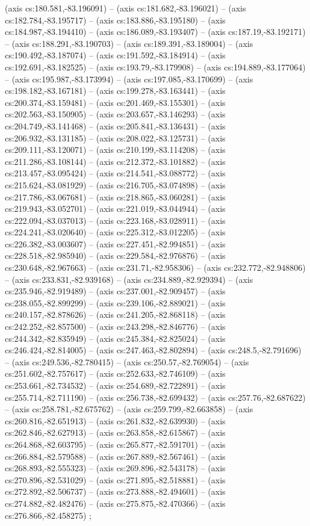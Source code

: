     (axis cs:180.581,-83.196091) --  (axis cs:181.682,-83.196021) --  (axis cs:182.784,-83.195717) --  (axis cs:183.886,-83.195180) --  (axis cs:184.987,-83.194410) --  (axis cs:186.089,-83.193407) --  (axis cs:187.19,-83.192171) --  (axis cs:188.291,-83.190703) --  (axis cs:189.391,-83.189004) --  (axis cs:190.492,-83.187074) --  (axis cs:191.592,-83.184914) --  (axis cs:192.691,-83.182525) --  (axis cs:193.79,-83.179908) --  (axis cs:194.889,-83.177064) --  (axis cs:195.987,-83.173994) --  (axis cs:197.085,-83.170699) --  (axis cs:198.182,-83.167181) --  (axis cs:199.278,-83.163441) --  (axis cs:200.374,-83.159481) --  (axis cs:201.469,-83.155301) --  (axis cs:202.563,-83.150905) --  (axis cs:203.657,-83.146293) --  (axis cs:204.749,-83.141468) --  (axis cs:205.841,-83.136431) --  (axis cs:206.932,-83.131185) --  (axis cs:208.022,-83.125731) --  (axis cs:209.111,-83.120071) --  (axis cs:210.199,-83.114208) --  (axis cs:211.286,-83.108144) --  (axis cs:212.372,-83.101882) --  (axis cs:213.457,-83.095424) --  (axis cs:214.541,-83.088772) --  (axis cs:215.624,-83.081929) --  (axis cs:216.705,-83.074898) --  (axis cs:217.786,-83.067681) --  (axis cs:218.865,-83.060281) --  (axis cs:219.943,-83.052701) --  (axis cs:221.019,-83.044944) --  (axis cs:222.094,-83.037013) --  (axis cs:223.168,-83.028911) --  (axis cs:224.241,-83.020640) --  (axis cs:225.312,-83.012205) --  (axis cs:226.382,-83.003607) --  (axis cs:227.451,-82.994851) --  (axis cs:228.518,-82.985940) --  (axis cs:229.584,-82.976876) --  (axis cs:230.648,-82.967663) --  (axis cs:231.71,-82.958306) --  (axis cs:232.772,-82.948806) --  (axis cs:233.831,-82.939168) --  (axis cs:234.889,-82.929394) --  (axis cs:235.946,-82.919489) --  (axis cs:237.001,-82.909457) --  (axis cs:238.055,-82.899299) --  (axis cs:239.106,-82.889021) --  (axis cs:240.157,-82.878626) --  (axis cs:241.205,-82.868118) --  (axis cs:242.252,-82.857500) --  (axis cs:243.298,-82.846776) --  (axis cs:244.342,-82.835949) --  (axis cs:245.384,-82.825024) --  (axis cs:246.424,-82.814005) --  (axis cs:247.463,-82.802894) --  (axis cs:248.5,-82.791696) --  (axis cs:249.536,-82.780415) --  (axis cs:250.57,-82.769054) --  (axis cs:251.602,-82.757617) --  (axis cs:252.633,-82.746109) --  (axis cs:253.661,-82.734532) --  (axis cs:254.689,-82.722891) --  (axis cs:255.714,-82.711190) --  (axis cs:256.738,-82.699432) --  (axis cs:257.76,-82.687622) --  (axis cs:258.781,-82.675762) --  (axis cs:259.799,-82.663858) --  (axis cs:260.816,-82.651913) --  (axis cs:261.832,-82.639930) --  (axis cs:262.846,-82.627913) --  (axis cs:263.858,-82.615867) --  (axis cs:264.868,-82.603795) --  (axis cs:265.877,-82.591701) --  (axis cs:266.884,-82.579588) --  (axis cs:267.889,-82.567461) --  (axis cs:268.893,-82.555323) --  (axis cs:269.896,-82.543178) --  (axis cs:270.896,-82.531029) --  (axis cs:271.895,-82.518881) --  (axis cs:272.892,-82.506737) --  (axis cs:273.888,-82.494601) --  (axis cs:274.882,-82.482476) --  (axis cs:275.875,-82.470366) --  (axis cs:276.866,-82.458275) ;
